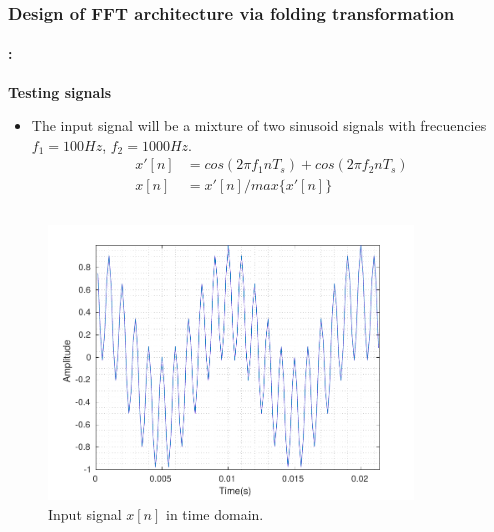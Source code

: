\begin{frame}
	\frametitle{\textbf{Design of FFT architecture via folding transformation}}
	\framesubtitle{\secname : \subsecname}
	\begin{block}{\centering \textbf{Testing signals}}
		\begin{itemize}\justifying\footnotesize
        	\item The input signal will be a mixture of two sinusoid signals with frecuencies  $f_1=100Hz$, $f_2=1000Hz$.
		\begin{align}\label{eq: inputSignal}
			x'[n] &= cos(2\pi f_1 n T_s) + cos(2\pi f_2 n T_s)  \\
			x[n] &= x'[n]/max\{x'[n]\} 						\nonumber
		\end{align}
		\end{itemize}	
	\end{block}
	\vspace{-0.75cm}
	\begin{columns}[t,onlytextwidth]
		\begin{column}{0.45\linewidth}
   			\begin{figure}[h!] \centering
	    		\includegraphics[height=0.35\paperheight]{./image/input_fx.pdf}
				\caption{\tiny Input signal $x[n]$ in time domain.}
	    	\end{figure}
	    \end{column}
	    \begin{column}{0.45\linewidth}
	    	\begin{figure}[h!] \centering

\end{figure}
\end{column}
\end{columns}
\end{frame}
